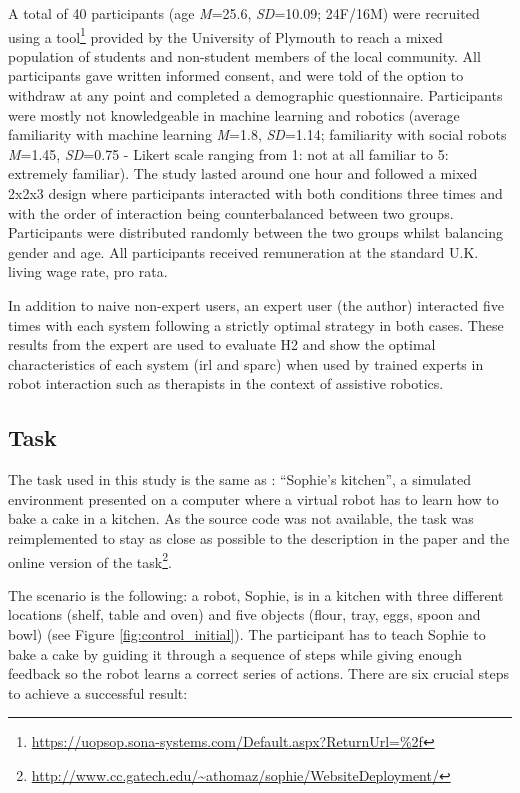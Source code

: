A total of 40 participants (age \textit{M}=25.6, \textit{SD}=10.09; 24F/16M) were recruited using a tool\footnote{\url{https://uopsop.sona-systems.com/Default.aspx?ReturnUrl=\%2f}} provided by the University of Plymouth to reach a mixed population of students and non-student members of the local community.  All participants gave written informed consent, and were told of the option to withdraw at any point and completed a demographic questionnaire. Participants were mostly not knowledgeable in machine learning and robotics (average familiarity with machine learning \textit{M}=1.8, \textit{SD}=1.14; familiarity with social robots \textit{M}=1.45, \textit{SD}=0.75 - Likert scale ranging from 1: not at all familiar to 5: extremely familiar). The study lasted around one hour and followed a mixed 2x2x3 design where participants interacted with both conditions three times and with the order of interaction being counterbalanced between two groups. Participants were distributed randomly between the two groups whilst balancing gender and age. All participants received remuneration at the standard U.K. living wage rate, pro rata. 

In addition to naive non-expert users, an expert user (the author) interacted five times with each system following a strictly optimal strategy in both cases. These results from the expert are used to evaluate H2 and show the optimal characteristics of each system (\gls{irl} and \gls{sparc}) when used by trained experts in robot interaction such as therapists in the context of assistive robotics.


\subsection{Task} \label{ssec:control_task}

The task used in this study is the same as \cite{thomaz2008teachable}: ``Sophie's kitchen'', a simulated environment presented on a computer where a virtual robot has to learn how to bake a cake in a kitchen. As the source code was not available, the task was reimplemented to stay as close as possible to the description in the paper and the online version of the task\footnote{\url{http://www.cc.gatech.edu/~athomaz/sophie/WebsiteDeployment/}}.

The scenario is the following: a robot, Sophie, is in a kitchen with three different locations (shelf, table and oven) and five objects (flour, tray, eggs, spoon and bowl) (see Figure \ref{fig:control_initial}). The participant has to teach Sophie to bake a cake by guiding it through a sequence of steps while giving enough feedback so the robot learns a correct series of actions. There are six crucial steps to achieve a successful result:

